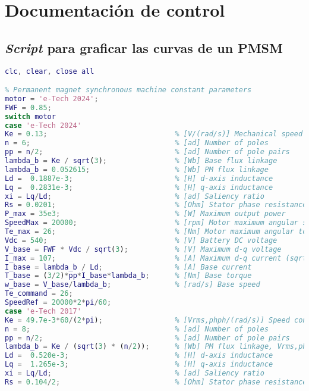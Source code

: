 \chapter{Documentación de control}
\section{\textit{Script} para graficar las curvas de un PMSM}
\begin{lstlisting}[language=Matlab, basicstyle=\ttfamily\small, breaklines=true, frame=single]
clc, clear, close all

% Permanent magnet synchronous machine constant parameters
motor = 'e-Tech 2024';
FWF = 0.85;
switch motor
case 'e-Tech 2024'
Ke = 0.13;                              % [V/(rad/s)] Mechanical speed constant
n = 6;                                  % [ad] Number of poles 
pp = n/2;                               % [ad] Number of pole pairs
lambda_b = Ke / sqrt(3);                % [Wb] Base flux linkage
lambda_b = 0.052615;                    % [Wb] PM flux linkage
Ld =  0.1887e-3;                        % [H] d-axis inductance
Lq =  0.2831e-3;                        % [H] q-axis inductance
xi = Lq/Ld;                             % [ad] Saliency ratio
Rs = 0.0201;                            % [Ohm] Stator phase resistance (phase-to-phase/2)
P_max = 35e3;                           % [W] Maximum output power
SpeedMax = 20000;                       % [rpm] Motor maximum angular speed
Te_max = 26;                            % [Nm] Motor maximum angular torque
Vdc = 540;                              % [V] Battery DC voltage
V_base = FWF * Vdc / sqrt(3);           % [V] Maximum d-q voltage
I_max = 107;                            % [A] Maximum d-q current (sqrt(i_d^2+i_q^2))
I_base = lambda_b / Ld;                 % [A] Base current
T_base = (3/2)*pp*I_base*lambda_b;      % [Nm] Base torque
w_base = V_base/lambda_b;               % [rad/s] Base speed
Te_command = 26;
SpeedRef = 20000*2*pi/60;  
case 'e-Tech 2017'
Ke = 49.7e-3*60/(2*pi);                 % [Vrms,phph/(rad/s)] Speed constant, Vrms,phph/wm
n = 8;                                  % [ad] Number of poles 
pp = n/2;                               % [ad] Number of pole pairs
lambda_b = Ke / (sqrt(3) * (n/2));      % [Wb] PM flux linkage, Vrms,phn/we
Ld =  0.520e-3;                         % [H] d-axis inductance
Lq =  1.265e-3;                         % [H] q-axis inductance
xi = Lq/Ld;                             % [ad] Saliency ratio
Rs = 0.104/2;                           % [Ohm] Stator phase resistance (phase-to-phase/2)

\end{lstlisting}
